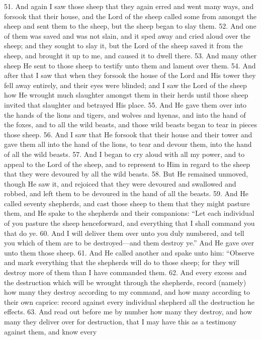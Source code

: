 51. And again I saw those sheep that they again
erred and went many ways, and forsook that their
house, and the Lord of the sheep called some from
amongst the sheep and sent them to the sheep, but
the sheep began to slay them. 52. And one of them
was saved and was not slain, and it sped away and
cried aloud over the sheep; and they sought to slay
it, but the Lord of the sheep saved it from the sheep,
and brought it up to me, and caused it to dwell there.
53. And many other sheep He sent to those sheep to
testify unto them and lament over them. 54. And
after that I saw that when they forsook the house of
the Lord and His tower they fell away entirely, and
their eyes were blinded; and I saw the Lord of the
sheep how He wrought much slaughter amongst
them in their herds until those sheep invited that
slaughter and betrayed His place. 55. And He
gave them over into the hands of the lions and tigers,
and wolves and hyenas, and into the hand of the
foxes, and to all the wild beasts, and those wild beasts
began to tear in pieces those sheep. 56. And I saw
that He forsook that their house and their tower and
gave them all into the hand of the lions, to tear and
devour them, into the hand of all the wild beasts.
57. And I began to cry aloud with all my power, and
to appeal to the Lord of the sheep, and to represent
to Him in regard to the sheep that they were devoured
by all the wild beasts. 58. But He remained unmoved,
though He saw it, and rejoiced that they were
devoured and swallowed and robbed, and left them
to be devoured in the hand of all the beasts. 59. And
He called seventy shepherds, and cast those sheep
to them that they might pasture them, and He spake
to the shepherds and their companions: “Let each
individual of you pasture the sheep henceforward, and
everything that I shall command you that do ye. 60.
And I will deliver them over unto you duly numbered,
and tell you which of them are to be destroyed—and
them destroy ye.” And He gave over unto them
those sheep. 61. And He called another and spake
unto him: “Observe and mark everything that the
shepherds will do to those sheep; for they will destroy
more of them than I have commanded them. 62. And
every excess and the destruction which will be
wrought through the shepherds, record (namely)
how many they destroy according to my command,
and how many according to their own caprice:
record against every individual shepherd all the
destruction he effects. 63. And read out before me
by number how many they destroy, and how many
they deliver over for destruction, that I may have
this as a testimony against them, and know every
